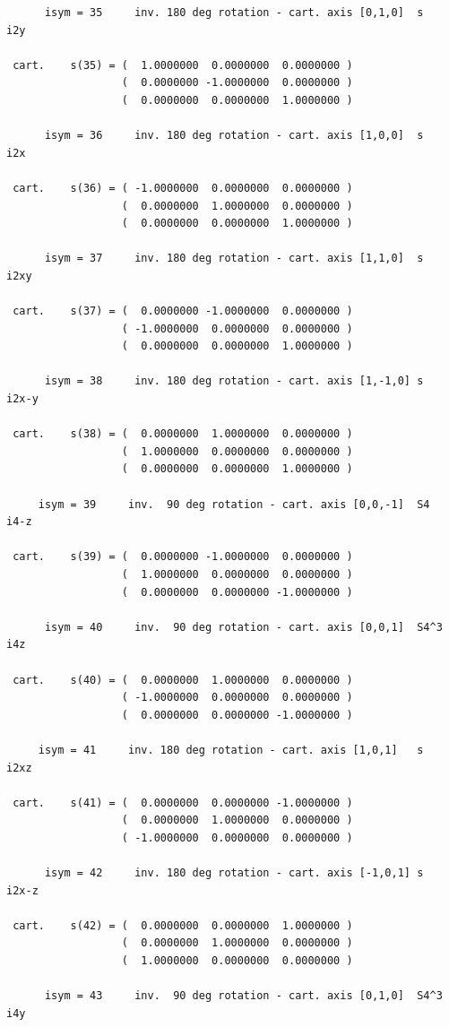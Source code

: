 \documentclass[12pt,a4paper]{article}
\begin{document}
\begin{verbatim}
      isym = 35     inv. 180 deg rotation - cart. axis [0,1,0]  s      i2y

 cart.    s(35) = (  1.0000000  0.0000000  0.0000000 )
                  (  0.0000000 -1.0000000  0.0000000 )
                  (  0.0000000  0.0000000  1.0000000 )

      isym = 36     inv. 180 deg rotation - cart. axis [1,0,0]  s      i2x

 cart.    s(36) = ( -1.0000000  0.0000000  0.0000000 )
                  (  0.0000000  1.0000000  0.0000000 )
                  (  0.0000000  0.0000000  1.0000000 )

      isym = 37     inv. 180 deg rotation - cart. axis [1,1,0]  s      i2xy

 cart.    s(37) = (  0.0000000 -1.0000000  0.0000000 )
                  ( -1.0000000  0.0000000  0.0000000 )
                  (  0.0000000  0.0000000  1.0000000 )

      isym = 38     inv. 180 deg rotation - cart. axis [1,-1,0] s      i2x-y

 cart.    s(38) = (  0.0000000  1.0000000  0.0000000 )
                  (  1.0000000  0.0000000  0.0000000 )
                  (  0.0000000  0.0000000  1.0000000 )

     isym = 39     inv.  90 deg rotation - cart. axis [0,0,-1]  S4     i4-z

 cart.    s(39) = (  0.0000000 -1.0000000  0.0000000 )
                  (  1.0000000  0.0000000  0.0000000 )
                  (  0.0000000  0.0000000 -1.0000000 )

      isym = 40     inv.  90 deg rotation - cart. axis [0,0,1]  S4^3   i4z

 cart.    s(40) = (  0.0000000  1.0000000  0.0000000 )
                  ( -1.0000000  0.0000000  0.0000000 )
                  (  0.0000000  0.0000000 -1.0000000 )

     isym = 41     inv. 180 deg rotation - cart. axis [1,0,1]   s      i2xz

 cart.    s(41) = (  0.0000000  0.0000000 -1.0000000 )
                  (  0.0000000  1.0000000  0.0000000 )
                  ( -1.0000000  0.0000000  0.0000000 )

      isym = 42     inv. 180 deg rotation - cart. axis [-1,0,1] s      i2x-z

 cart.    s(42) = (  0.0000000  0.0000000  1.0000000 )
                  (  0.0000000  1.0000000  0.0000000 )
                  (  1.0000000  0.0000000  0.0000000 )

      isym = 43     inv.  90 deg rotation - cart. axis [0,1,0]  S4^3   i4y


\end{verbatim}
\end{document}
